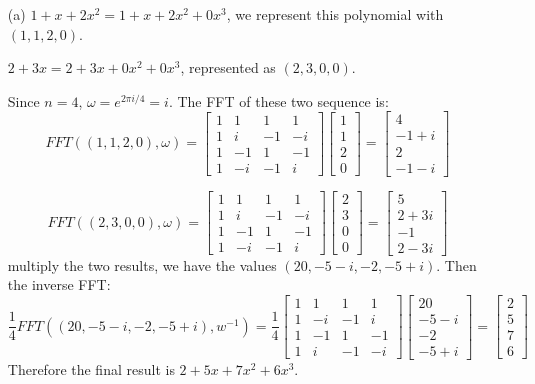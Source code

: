 \documentclass[twoside]{homework}
\begin{document}
\begin{enumerate}
	\item [(a)] $1 + x + 2x^2 = 1 + x + 2x^2 + 0x^3$, we represent this polynomial with $(1, 1, 2, 0)$.

	$2 + 3x = 2 + 3x + 0x^2 + 0x^3$, represented as $(2, 3, 0, 0)$.

	Since $n = 4$, $\omega = e^{2\pi i/4} = i$. The FFT of these two sequence is:
	\[FFT((1, 1, 2, 0), \omega) = \begin{bmatrix}
		1 & 1 & 1 & 1 \\
		1 & i & -1 & -i \\
		1 & -1 & 1 & -1 \\
		1 & -i & -1 & i
	\end{bmatrix} \begin{bmatrix}
		1 \\ 1 \\ 2 \\ 0
	\end{bmatrix}
	= \begin{bmatrix}
		4 \\ -1 + i \\ 2 \\ -1 -i
	\end{bmatrix}
	\]

	\[FFT((2, 3, 0, 0), \omega) = \begin{bmatrix}
		1 & 1 & 1 & 1 \\
		1 & i & -1 & -i \\
		1 & -1 & 1 & -1 \\
		1 & -i & -1 & i
	\end{bmatrix} \begin{bmatrix}
		2 \\ 3\\ 0\\0
	\end{bmatrix}
	= \begin{bmatrix}
		5 \\ 2 + 3i \\ -1 \\ 2 - 3i
	\end{bmatrix}
	\]
	multiply the two results, we have the values $(20, -5-i, -2, -5+i)$. Then the inverse FFT:
	\[\frac{1}{4}FFT((20,-5-i,-2,-5+i), w^{-1}) = \frac{1}{4}\begin{bmatrix}
		1 & 1 & 1 & 1 \\
		1 & -i & -1 & i \\
		1 & -1 & 1 & -1 \\
		1 & i & -1 & -i
	\end{bmatrix} \begin{bmatrix}
		20 \\ -5-i \\ -2 \\ -5+i
	\end{bmatrix}
	= \begin{bmatrix}
		2 \\ 5 \\ 7 \\ 6
	\end{bmatrix}\]
	Therefore the final result is $2 + 5x + 7x^2 + 6x^3$.
\end{enumerate}
\end{document}
